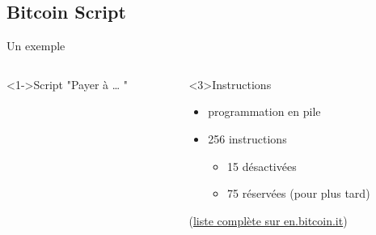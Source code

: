 \documentclass[presentation]{beamer}
\begin{document}
\subsection{Bitcoin Script}
\label{sec:org72d14df}
\begin{frame}[label={sec:org1132707}]{Un exemple}
\begin{columns}
\begin{column}{0.46\columnwidth}
\begin{block}<1->{Script "Payer à \ldots{} "}

\end{block}
\end{column}

\begin{column}{0.46\columnwidth}
\begin{block}<3>{Instructions}
\begin{itemize}
\item programmation en pile
\item 256 instructions 
\begin{itemize}
\item 15 désactivées
\item 75 réservées (pour plus tard)
\end{itemize}
\end{itemize}
(\href{https://en.bitcoin.it/wiki/Script}{liste complète sur en.bitcoin.it})
\end{block}
\end{column}
\end{columns}
\end{frame}
\end{document}
